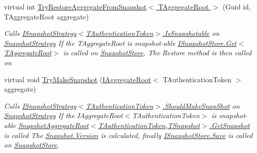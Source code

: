 \begin{DoxyCompactItemize}
\item 
virtual int \hyperlink{classCqrs_1_1Snapshots_1_1SnapshotRepository_a1328c103474b2b394b7af61a24455a65_a1328c103474b2b394b7af61a24455a65}{Try\+Restore\+Aggregate\+From\+Snapshot$<$ T\+Aggregate\+Root $>$} (Guid id, T\+Aggregate\+Root aggregate)
\begin{DoxyCompactList}\small\item\em Calls \hyperlink{interfaceCqrs_1_1Snapshots_1_1ISnapshotStrategy_a02121821312c4ce2811b31eeaffabe51_a02121821312c4ce2811b31eeaffabe51}{I\+Snapshot\+Strategy$<$\+T\+Authentication\+Token$>$.\+Is\+Snapshotable} on \hyperlink{classCqrs_1_1Snapshots_1_1SnapshotRepository_a7d65b4df10d0b6f75c911a9b6d59b3ba_a7d65b4df10d0b6f75c911a9b6d59b3ba}{Snapshot\+Strategy} If the {\itshape T\+Aggregate\+Root}  is snapshot-\/able \hyperlink{interfaceCqrs_1_1Snapshots_1_1ISnapshotStore_ab7bd163fc9cd5c3bd5911679030be403_ab7bd163fc9cd5c3bd5911679030be403}{I\+Snapshot\+Store.\+Get$<$\+T\+Aggregate\+Root$>$} is called on \hyperlink{classCqrs_1_1Snapshots_1_1SnapshotRepository_aba01e9f20eb41e6f3e4476a7f3182275_aba01e9f20eb41e6f3e4476a7f3182275}{Snapshot\+Store}. The Restore method is then called on \end{DoxyCompactList}\item 
virtual void \hyperlink{classCqrs_1_1Snapshots_1_1SnapshotRepository_a06b3211ded753ed79c3080819b16d496_a06b3211ded753ed79c3080819b16d496}{Try\+Make\+Snapshot} (\hyperlink{interfaceCqrs_1_1Domain_1_1IAggregateRoot}{I\+Aggregate\+Root}$<$ T\+Authentication\+Token $>$ aggregate)
\begin{DoxyCompactList}\small\item\em Calls \hyperlink{interfaceCqrs_1_1Snapshots_1_1ISnapshotStrategy_ab1d54cd76c7ac832329cb3a6de0effcd_ab1d54cd76c7ac832329cb3a6de0effcd}{I\+Snapshot\+Strategy$<$\+T\+Authentication\+Token$>$.\+Should\+Make\+Snap\+Shot} on \hyperlink{classCqrs_1_1Snapshots_1_1SnapshotRepository_a7d65b4df10d0b6f75c911a9b6d59b3ba_a7d65b4df10d0b6f75c911a9b6d59b3ba}{Snapshot\+Strategy} If the I\+Aggregate\+Root$<$\+T\+Authentication\+Token$>$ is snapshot-\/able \hyperlink{classCqrs_1_1Snapshots_1_1SnapshotAggregateRoot_a30ec8fe3a09fec8238c5921c629a5ac1_a30ec8fe3a09fec8238c5921c629a5ac1}{Snapshot\+Aggregate\+Root$<$\+T\+Authentication\+Token,\+T\+Snapshot$>$.\+Get\+Snapshot} is called The \hyperlink{classCqrs_1_1Snapshots_1_1Snapshot_a59c0a399430e5f4a1b27d999c3bb5d4f_a59c0a399430e5f4a1b27d999c3bb5d4f}{Snapshot.\+Version} is calculated, finally \hyperlink{interfaceCqrs_1_1Snapshots_1_1ISnapshotStore_a6e99c620115ce8a0648a83bf2ce05527_a6e99c620115ce8a0648a83bf2ce05527}{I\+Snapshot\+Store.\+Save} is called on \hyperlink{classCqrs_1_1Snapshots_1_1SnapshotRepository_aba01e9f20eb41e6f3e4476a7f3182275_aba01e9f20eb41e6f3e4476a7f3182275}{Snapshot\+Store}. \end{DoxyCompactList}\end{DoxyCompactItemize}
